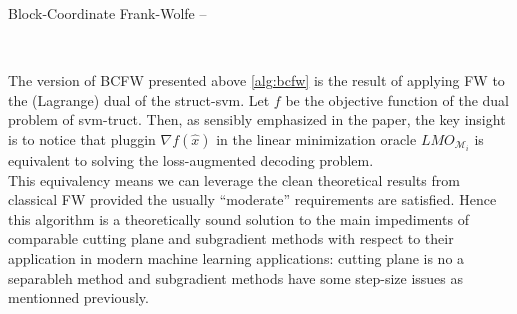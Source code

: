  \begin{algorithm}[htbp!]
    \caption{Block-Coordinate Frank-Wolfe -- 
\citet{lacoste-julienBlockCoordinateFrankWolfeOptimization2013}}
    \label{alg:bcfw}
\begin{algorithmic}
\\
    \ENDFOR
\end{algorithmic}
\end{algorithm}
\clearpage

The version of BCFW presented above \ref{alg:bcfw} is the result of applying
FW to the (Lagrange) dual of the struct-svm. Let $f$ be the objective function
of the dual problem of svm-truct. Then, as sensibly emphasized in the paper,
the key insight is to notice that pluggin $\nabla f(\hat x)$ in the linear
minimization oracle $LMO_{\mathcal M_i}$ is equivalent to solving the
loss-augmented decoding problem. \\

This equivalency means we can leverage the clean theoretical results from
classical FW provided the usually ``moderate'' requirements are satisfied. Hence
this algorithm is a theoretically sound solution to the main impediments of
comparable cutting plane and subgradient methods with respect to their
application in modern machine learning applications: cutting plane is no a
separableh method and subgradient methods have some step-size issues as
mentionned previously.



